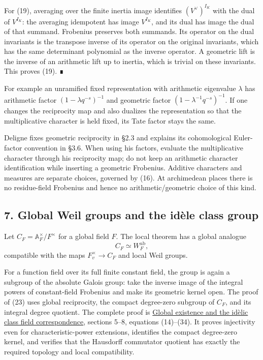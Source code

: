 \documentclass[11pt,a4paper]{article}
\begin{document}
For (19), averaging over the finite inertia image identifies
\((V^\vee)^{I_K}\) with the dual of \(V^{I_K}\): the averaging
idempotent has image \(V^{I_K}\), and its dual has image the dual of
that summand. Frobenius preserves both summands. Its operator on the
dual invariants is the transpose inverse of its operator on the original
invariants, which has the same determinant polynomial as the inverse
operator. A geometric lift is the inverse of an arithmetic lift up to
inertia, which is trivial on these invariants. This proves (19). ∎

For example an unramified fixed representation with arithmetic
eigenvalue \(\lambda\) has arithmetic factor \((1-\lambda q^{-s})^{-1}\)
and geometric factor \((1-\lambda^{-1}q^{-s})^{-1}\). If one changes the
reciprocity map and also dualizes the representation so that the
multiplicative character is held fixed, its Tate factor stays the same.

Deligne fixes geometric reciprocity in §2.3 and explains its
cohomological Euler-factor convention in §3.6. When using his factors,
evaluate the multiplicative character through his reciprocity map; do
not keep an arithmetic character identification while inserting a
geometric Frobenius. Additive characters and measures are separate
choices, governed by (16). At archimedean places there is no
residue-field Frobenius and hence no arithmetic/geometric choice of this
kind.

\subsection{7. Global Weil groups and the idèle class
group}\label{global-weil-groups-and-the-iduxe8le-class-group}

Let \(C_F=\mathbb A_F^\times/F^\times\) for a global field \(F\). The
local theorem has a global analogue \[
C_F\simeq W_F^{\mathrm{ab}},
\tag{23}
\] compatible with the maps \(F_v^\times\to C_F\) and local Weil groups.

For a function field over its full finite constant field, the group is
again a subgroup of the absolute Galois group: take the inverse image of
the integral powers of constant-field Frobenius and make its geometric
kernel open. The proof of (23) uses global reciprocity, the compact
degree-zero subgroup of \(C_F\), and its integral degree quotient. The
complete proof is
\href{../global-existence-and-the-idelic-class-field-correspondence.html}{Global
existence and the idèlic class field correspondence}, sections 5--8,
equations (14)--(34). It proves injectivity even for
characteristic-power extensions, identifies the compact degree-zero
kernel, and verifies that the Hausdorff commutator quotient has exactly
the required topology and local compatibility.
\end{document}
